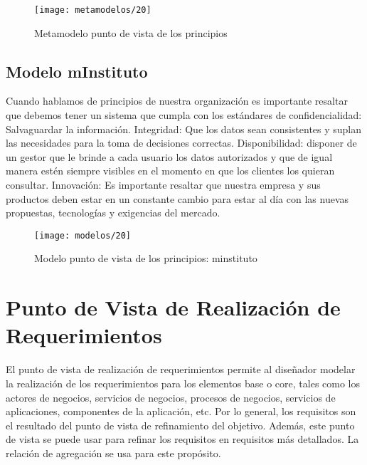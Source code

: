    \begin{figure}[H]
   	\centering
   	\texttt{[image: metamodelos/20]}
   	\captionsetup{width=.95\textwidth}
   	\caption{Metamodelo punto de vista de los principios}
   	\label{metamodelo20}
   \end{figure}
   
   \subsection{Modelo mInstituto}
   Cuando hablamos de principios de nuestra organización es importante resaltar que debemos tener un sistema que cumpla con los estándares de confidencialidad: Salvaguardar la información. Integridad: Que los datos sean consistentes y suplan las necesidades para la toma de decisiones correctas. Disponibilidad: disponer de un gestor que le brinde a cada usuario los datos autorizados y que de igual manera estén siempre visibles en el momento en que los clientes los quieran consultar. Innovación: Es importante resaltar que nuestra empresa y sus productos deben estar en un constante cambio para estar al día con las nuevas propuestas, tecnologías y exigencias del mercado.
   \begin{figure}[H]
   	\centering
   	\texttt{[image: modelos/20]}
   	\captionsetup{width=.95\textwidth}
   	\caption{Modelo punto de vista de los principios: minstituto}
   	\label{modelo20}
   \end{figure}
   
\section{Punto de Vista de Realización de Requerimientos}
El punto de vista de realización de requerimientos permite al diseñador modelar la realización de los requerimientos para los elementos base o core, tales como los actores de negocios, servicios de negocios, procesos de negocios, servicios de aplicaciones, componentes de la aplicación, etc. Por lo general, los requisitos son el resultado del punto de vista de refinamiento del objetivo. Además, este punto de vista se puede usar para refinar los requisitos en requisitos más detallados. La relación de agregación se usa para este propósito.
   

